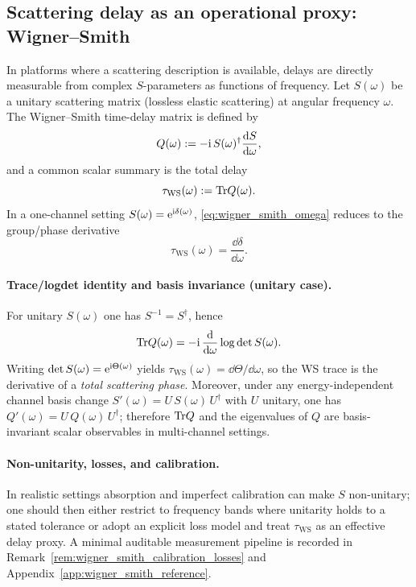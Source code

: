 \subsection{Scattering delay as an operational proxy: Wigner--Smith}
\label{app:wigner_smith_delay_z128}

In platforms where a scattering description is available, delays are directly measurable from complex $S$-parameters as functions of frequency.
Let $S(\omega)$ be a unitary scattering matrix (lossless elastic scattering) at angular frequency $\omega$.
The Wigner--Smith time-delay matrix is defined by \cite{Wigner1955,Smith1960}
\begin{equation}
\label{eq:wigner_smith_omega}
Q(\omega):=-\mathrm{i}\,S(\omega)^\dagger\frac{\mathrm{d} S}{\mathrm{d} \omega},
\end{equation}
and a common scalar summary is the total delay
\begin{equation}
\label{eq:tau_ws_trace_omega}
\tau_{\mathrm{WS}}(\omega):=\mathrm{Tr} Q(\omega).
\end{equation}
In a one-channel setting $S(\omega)=\mathrm{e}^{\mathrm{i}\delta(\omega)}$, \eqref{eq:wigner_smith_omega} reduces to the group/phase derivative
\begin{equation}
\label{eq:wigner_smith_one_channel}
\tau_{\mathrm{WS}}(\omega)=\frac{\dd\delta}{\dd\omega}.
\end{equation}

\paragraph{Trace/logdet identity and basis invariance (unitary case).}
\InterfaceTag For unitary $S(\omega)$ one has $S^{-1}=S^\dagger$, hence
\[
\mathrm{Tr} Q(\omega)=-\mathrm{i}\,\frac{\mathrm{d}}{\mathrm{d} \omega}\log\det S(\omega).
\]
Writing $\det S(\omega)=\mathrm{e}^{\mathrm{i} \Theta(\omega)}$ yields $\tau_{\mathrm{WS}}(\omega)=\dd\Theta/\dd\omega$, so the WS trace is the derivative of a \emph{total scattering phase}.
Moreover, under any energy-independent channel basis change $S'(\omega)=U\,S(\omega)\,U^\dagger$ with $U$ unitary, one has $Q'(\omega)=U\,Q(\omega)\,U^\dagger$; therefore $\mathrm{Tr} Q$ and the eigenvalues of $Q$ are basis-invariant scalar observables in multi-channel settings.

\paragraph{Non-unitarity, losses, and calibration.}
\InterfaceTag In realistic settings absorption and imperfect calibration can make $S$ non-unitary; one should then either restrict to frequency bands where unitarity holds to a stated tolerance or adopt an explicit loss model and treat $\tau_{\mathrm{WS}}$ as an effective delay proxy.
A minimal auditable measurement pipeline is recorded in Remark~\ref{rem:wigner_smith_calibration_losses} and Appendix~\ref{app:wigner_smith_reference}.

